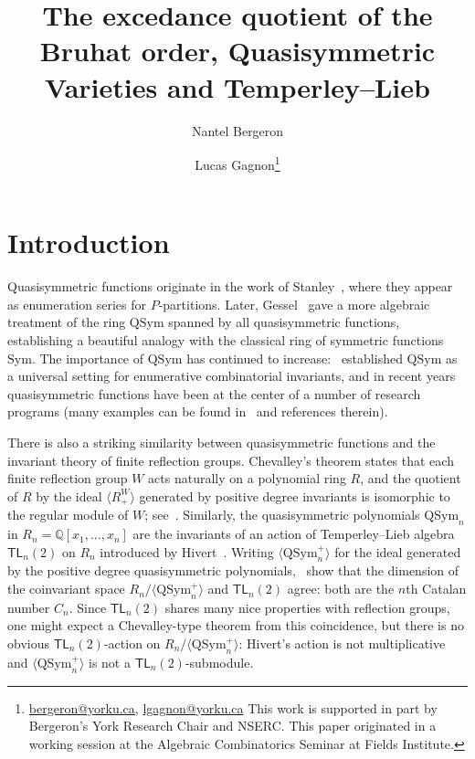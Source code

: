 \documentclass[submission]{FPSAC2024}
\title[Quasisymmetric Varieties and Temperley--Lieb algebras]{The excedance quotient of the Bruhat order, Quasisymmetric Varieties and Temperley--Lieb}
\author{Nantel Bergeron \and Lucas Gagnon\thanks{\href{mailto:bergeron@yorku.ca}{bergeron@yorku.ca}, \href{mailto:lgagnon@yorku.ca}{lgagnon@yorku.ca} This work is supported in part by Bergeron's York Research Chair and NSERC. This paper originated in a working session at the Algebraic Combinatorics Seminar at Fields Institute.}\addressmark{1}}
\theoremstyle{definition}
\theoremstyle{remark}
\numberwithin{equation}{section}
\newcommand{\QQ}{\mathbb{Q}}
\newcommand{\TL}{\mathsf{TL}}
\newcommand{\Sym}{\mathrm{Sym}}
\newcommand{\QSym}{\mathrm{QSym}}
\begin{document}
\maketitle


\section{Introduction}

Quasisymmetric functions originate in the work of Stanley~\cite{S72}, where they appear as enumeration series for $P$-partitions.  
Later, Gessel~\cite{Gessel} gave a more algebraic treatment of the ring $\QSym$ spanned by all quasisymmetric functions, establishing a beautiful analogy with the classical ring of symmetric functions $\Sym$. 
The importance of $\QSym$ has continued to increase:~\cite{ABS} established $\QSym$ as a universal setting for enumerative combinatorial invariants, and in recent years quasisymmetric functions have been at the center of a number of research programs (many examples can be found in~\cite{Grinberg,LMvW, Mason} and references therein).

There is also a striking similarity between quasisymmetric functions and the invariant theory of finite reflection groups.  
Chevalley's theorem states that each finite reflection group $W$ acts naturally on a polynomial ring $R$, and the quotient of $R$ by the ideal $\langle R_{+}^{W} \rangle$ generated by positive degree invariants is isomorphic to the regular module of $W$; see~\cite[Chapter 3]{Humphrey}.  
Similarly, the quasisymmetric polynomials $\QSym_{n}$ in $R_{n} = \QQ[x_{1}, \ldots, x_{n}]$ are the invariants of an action of  Temperley--Lieb algebra $\TL_{n}(2)$ on $R_{n}$  introduced by Hivert~\cite{Hivert}.  
Writing $\langle \QSym_{n}^{+} \rangle$
for the ideal generated by the positive degree quasisymmetric polynomials,~\cite{AB,ABB} show that the dimension of the coinvariant space $R_{n}\big/\langle \QSym_{n}^{+} \rangle$ and $\TL_{n}(2)$ agree: both are the $n$th Catalan number $C_{n}$.  
Since $\TL_{n}(2)$ shares many nice properties with reflection groups, one might expect a Chevalley-type theorem from this coincidence, but there is no obvious $\TL_{n}(2)$-action on $R_{n}\big/\langle \QSym_{n}^{+} \rangle$:  Hivert's action is not multiplicative and $\langle \QSym_{n}^{+} \rangle$ is not a $\TL_{n}(2)$-submodule.  
\end{document}
